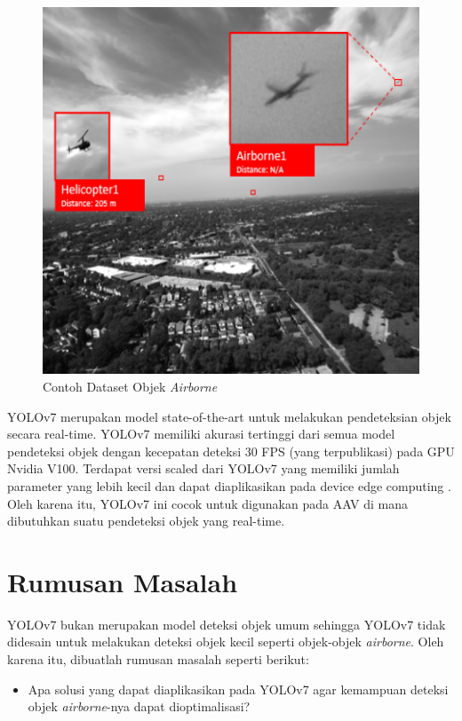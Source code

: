     \begin{figure} [ht]
        \centering
        \includegraphics[scale=0.5]{pictures/dataset-example-labeled.png}
        \caption{Contoh Dataset Objek \emph{Airborne}}
        \label{fig:airborne-object-example-1}
    \end{figure}

    YOLOv7 merupakan model state-of-the-art untuk melakukan pendeteksian objek secara real-time.
    YOLOv7 memiliki akurasi tertinggi dari semua model pendeteksi objek dengan kecepatan deteksi 30 FPS (yang terpublikasi) pada GPU Nvidia V100.
    Terdapat versi scaled dari YOLOv7 yang memiliki jumlah parameter yang lebih kecil dan dapat diaplikasikan pada device edge computing \parencite{yolov7}.
    Oleh karena itu, YOLOv7 ini cocok untuk digunakan pada AAV di mana dibutuhkan suatu pendeteksi objek yang real-time.

\section{Rumusan Masalah}
    YOLOv7 bukan merupakan model deteksi objek umum sehingga YOLOv7 tidak didesain untuk melakukan deteksi objek kecil seperti objek-objek \emph{airborne}.
    Oleh karena itu, dibuatlah rumusan masalah seperti berikut:
    \begin{itemize}
        \item Apa solusi yang dapat diaplikasikan pada YOLOv7 agar kemampuan deteksi objek \emph{airborne}-nya dapat dioptimalisasi?
    \end{itemize}

